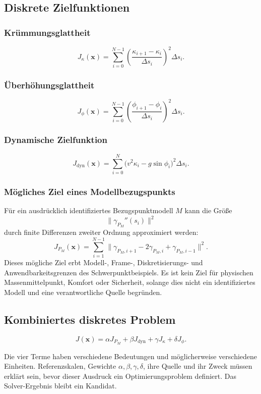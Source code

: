 \subsection{Diskrete Zielfunktionen}
\subsubsection{Krümmungsglattheit}
\[
J_\kappa(\mathbf x)=\sum_{i=0}^{N-1}
\left(\frac{\kappa_{i+1}-\kappa_i}{\Delta s_i}\right)^2\Delta s_i.
\]
\subsubsection{Überhöhungsglattheit}
\[
J_\phi(\mathbf x)=\sum_{i=0}^{N-1}
\left(\frac{\phi_{i+1}-\phi_i}{\Delta s_i}\right)^2\Delta s_i.
\]
\subsubsection{Dynamische Zielfunktion}
\[
J_{\mathrm{dyn}}(\mathbf x)=\sum_{i=0}^{N}
\bigl(v^2\kappa_i-g\sin\phi_i\bigr)^2\Delta s_i.
\]
\subsubsection{Mögliches Ziel eines Modellbezugspunkts}
Für ein ausdrücklich identifiziertes Bezugspunktmodell \(M\) kann die Größe
\[
\|\gamma_{P_M}''(s_i)\|^2
\]
durch finite Differenzen zweiter Ordnung approximiert werden:
\[
J_{P_M}(\mathbf x)=\sum_{i=1}^{N-1}
\|\gamma_{P_M,i+1}-2\gamma_{P_M,i}+\gamma_{P_M,i-1}\|^2.
\]
Dieses mögliche Ziel erbt Modell-, Frame-, Diskretisierungs- und
Anwendbarkeitsgrenzen des Schwerpunktbeispiels. Es ist kein Ziel für
physischen Massenmittelpunkt, Komfort oder Sicherheit, solange dies nicht ein
identifiziertes Modell und eine verantwortliche Quelle begründen.

\subsection{Kombiniertes diskretes Problem}
\begin{definition}
\[
J(\mathbf x)=\alpha J_{P_M}+\beta J_{\mathrm{dyn}}
+\gamma J_\kappa+\delta J_\phi.
\]
\end{definition}
Die vier Terme haben verschiedene Bedeutungen und möglicherweise verschiedene
Einheiten. Referenzskalen, Gewichte \(\alpha,\beta,\gamma,\delta\), ihre Quelle
und ihr Zweck müssen erklärt sein, bevor dieser Ausdruck ein
Optimierungsproblem definiert. Das Solver-Ergebnis bleibt ein Kandidat.

